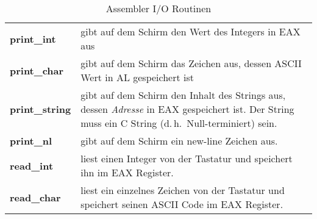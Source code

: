 \begin{table}[ht] %
\newlength{\itemsp} \setlength{\itemsp}{0.25em}
\centering
\begin{tabular}{lp{94mm}}
 {\bf print\_int}    & gibt auf dem Schirm den Wert des Integers in
                       EAX aus \\[\itemsp]
 {\bf print\_char}   & gibt auf dem Schirm das Zeichen
                       aus, dessen ASCII Wert in AL gespeichert ist \\[\itemsp]
 {\bf print\_string} & gibt auf dem Schirm den Inhalt des Strings aus, dessen
                       {\em Adresse} in EAX gespeichert ist. Der String muss ein
                       C String (d.\,h.\ Null-terminiert) sein. \\[\itemsp]
 {\bf print\_nl}     & gibt auf dem Schirm ein new-line Zeichen aus. \\[\itemsp]
 {\bf read\_int}     & liest einen Integer von der Tastatur und
                       speichert ihn im EAX Register. \\[\itemsp]
 {\bf read\_char}    & liest ein einzelnes Zeichen von der Tastatur
                       und speichert seinen ASCII Code im EAX Register. \\
\end{tabular}
\caption{Assembler I/O Routinen \label{tab:asmio}  
  
}
\end{table}

